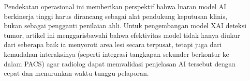 Pendekatan operasional ini memberikan perspektif bahwa luaran model AI berkinerja tinggi harus dirancang sebagai alat pendukung keputusan klinis, bukan sebagai pengganti penilaian ahli. Untuk pengembangan model XAI deteksi tumor, artikel ini menggarisbawahi bahwa efektivitas model tidak hanya diukur dari seberapa baik ia menyoroti area lesi secara terpusat, tetapi juga dari kemudahan interaksinya (seperti integrasi tangkapan sekunder berkontur ke dalam PACS) agar radiolog dapat memvalidasi penjelasan AI tersebut dengan cepat dan menurunkan waktu tunggu pelaporan.